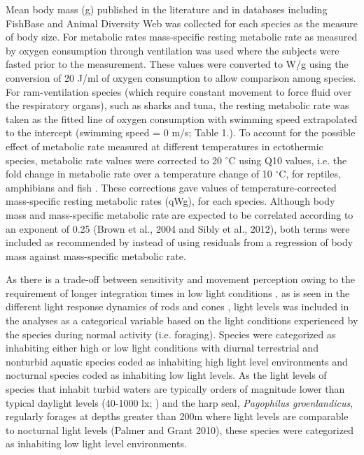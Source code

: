 Mean body mass (g) published in the literature and in databases including FishBase \citep{froese2012fishbase} and Animal Diversity Web \citep{myers2006animal} was collected for each species as the measure of body size. For metabolic rates mass-specific resting metabolic rate as measured by oxygen consumption through ventilation  was used where the subjects were fasted prior to the measurement. These values were converted to W/g using the conversion of 20 J/ml of oxygen consumption \citep{makarieva2008mean} to allow comparison among species. For ram-ventilation species (which require constant movement to force fluid over the respiratory organs), such as sharks and tuna, the resting metabolic rate was taken as the fitted line of oxygen consumption with swimming speed extrapolated to the intercept (swimming speed = 0 m/s; Table 1.). To account for the possible effect of metabolic rate measured at different temperatures in ectothermic species, metabolic rate values were corrected to 20 $^{\circ}$C using Q10 values, i.e. the fold change in metabolic rate over a temperature change of 10 $^{\circ}$C, for reptiles, amphibians and fish \citep{white2006scaling}. These corrections gave values of temperature-corrected mass-specific resting metabolic rates (qWg), for each species. Although body mass and mass-specific metabolic rate are expected to be correlated according to an exponent of 0.25 \citep{brown2004, sibly2012metabolic} (Brown et al., 2004 and Sibly et al., 2012), both terms were included as recommended by \cite{freckleton2009seven} instead of using residuals from a regression of body mass against mass-specific metabolic rate.

As there is a trade-off between sensitivity and movement perception owing to the requirement of longer integration times in low light conditions \citep{tansley1965vision}, as is seen in the different light response dynamics of rods and cones \citep{rubene2010presence}, light levels was included in the analyses as a categorical variable based on the light conditions experienced by the species during normal activity (i.e. foraging). Species were categorized as inhabiting either high or low light conditions with diurnal terrestrial and nonturbid aquatic species coded as inhabiting high light level environments and nocturnal species coded as inhabiting low light levels. As the light levels of species that inhabit turbid waters are typically orders of magnitude lower than typical daylight levels (40-1000 lx; \citealt{ali1985vision,palmer2010art,kreysing2012photonic}) and the harp seal, \textit{Pagophilus groenlandicus}, regularly forages at depths greater than 200m \citep{folkow2004distribution} where light levels are comparable to nocturnal light levels (Palmer and Grant 2010), these species were categorized as inhabiting low light level environments.


